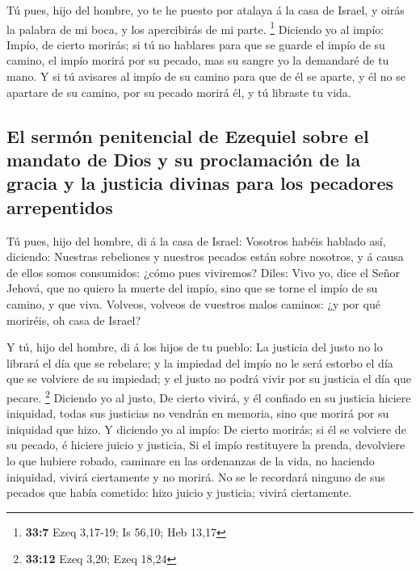  Tú pues, hijo del hombre, yo te he puesto por atalaya á la
casa de Israel, y oirás la palabra de mi boca, y los apercibirás de mi
parte. \footnote{\textbf{33:7} Ezeq 3,17-19; Is 56,10; Heb 13,17}
 Diciendo yo al impío: Impío, de cierto morirás; si tú no
hablares para que se guarde el impío de su camino, el impío morirá por
su pecado, mas su sangre yo la demandaré de tu mano.  Y si
tú avisares al impío de su camino para que de él se aparte, y él no se
apartare de su camino, por su pecado morirá él, y tú libraste tu vida.

\hypertarget{el-sermuxf3n-penitencial-de-ezequiel-sobre-el-mandato-de-dios-y-su-proclamaciuxf3n-de-la-gracia-y-la-justicia-divinas-para-los-pecadores-arrepentidos}{%
\subsection{El sermón penitencial de Ezequiel sobre el mandato de Dios y
su proclamación de la gracia y la justicia divinas para los pecadores
arrepentidos}\label{el-sermuxf3n-penitencial-de-ezequiel-sobre-el-mandato-de-dios-y-su-proclamaciuxf3n-de-la-gracia-y-la-justicia-divinas-para-los-pecadores-arrepentidos}}

 Tú pues, hijo del hombre, di á la casa de Israel: Vosotros
habéis hablado así, diciendo: Nuestras rebeliones y nuestros pecados
están sobre nosotros, y á causa de ellos somos consumidos: ¿cómo pues
viviremos?  Diles: Vivo yo, dice el Señor Jehová, que no
quiero la muerte del impío, sino que se torne el impío de su camino, y
que viva. Volveos, volveos de vuestros malos caminos: ¿y por qué
moriréis, oh casa de Israel?

 Y tú, hijo del hombre, di á los hijos de tu pueblo: La
justicia del justo no lo librará el día que se rebelare; y la impiedad
del impío no le será estorbo el día que se volviere de su impiedad; y el
justo no podrá vivir por su justicia el día que pecare. \footnote{\textbf{33:12}
  Ezeq 3,20; Ezeq 18,24}  Diciendo yo al justo, De cierto
vivirá, y él confiado en su justicia hiciere iniquidad, todas sus
justicias no vendrán en memoria, sino que morirá por su iniquidad que
hizo.  Y diciendo yo al impío: De cierto morirás; si él se
volviere de su pecado, é hiciere juicio y justicia,  Si el
impío restituyere la prenda, devolviere lo que hubiere robado, caminare
en las ordenanzas de la vida, no haciendo iniquidad, vivirá ciertamente
y no morirá.  No se le recordará ninguno de sus pecados que
había cometido: hizo juicio y justicia; vivirá ciertamente.

